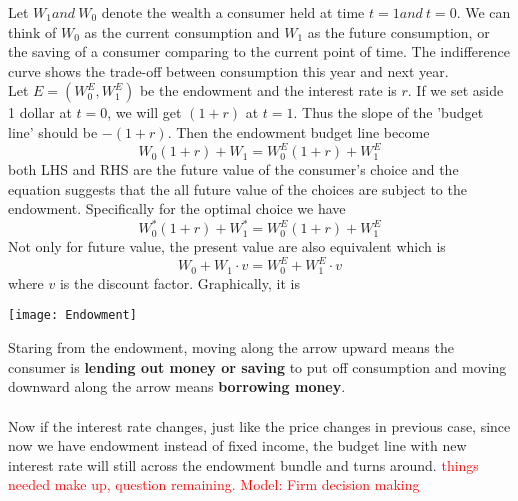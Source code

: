 \documentclass[10pt]{article}
\newenvironment{changemargin}[2]{%
  \begin{list}{}{%
    \setlength{\topsep}{0pt}%
    \setlength{\leftmargin}{#1}%
    \setlength{\rightmargin}{#2}%
    \setlength{\listparindent}{\parindent}%
    \setlength{\itemindent}{\parindent}%
    \setlength{\parsep}{\parskip}%
  }%
  \item[]}{\end{list}}
\begin{document}
\begin{changemargin}{-0.125in}{0in}
\begin{enumerate}
\begin{enumerate}
                    \smallskip
                    
                    Let $W_1 and \:W_0$ denote the wealth a consumer held at time $t=1 and \:t=0$. We can think of $W_0$ as the current consumption and $W_1$ as the future consumption, or the saving of a consumer comparing to the current point of time. The indifference curve shows the trade-off between consumption this year and next year. \\
                       
                        Let $E=(W_0^E,W_1^E)$ be the endowment and the interest rate is $r$. If we set aside 1 dollar at $t=0$, we will get $(1+r)$ at $t=1$. Thus the slope of the 'budget line' should be $-(1+r)$. Then the endowment budget line become 
                        \[
                        W_0(1+r) + W_1 = W_0^E(1+r) + W_1^E
                        \]
                       both LHS and RHS are the future value of the consumer's choice and the equation suggests that the all future value of the choices are subject to the endowment. Specifically for the optimal choice we have 
                        \[
                        W_0^*(1+r) + W_1^* = W_0^E(1+r) + W_1^E
                        \]
                        Not only for future value, the present value are also equivalent which is 
                        \[
                        W_0+W_1\cdot v = W_0^E + W_1^E \cdot v
                        \]
                        where $v$ is the discount factor. Graphically, it is 
                        
                        \begin{center}\texttt{[image: Endowment]}
                        \end{center}
                        
                        Staring from the endowment, moving along the arrow upward means the consumer is \textbf{lending out money or saving} to put off consumption and moving downward along the arrow means \textbf{borrowing money}.\\
                        \\
                        Now if the interest rate changes, just like the price changes in previous case, since now we have endowment instead of fixed income, the budget line with new interest rate will still across the endowment bundle and turns around. \textcolor{red}{things needed make up, question remaining. Model: Firm decision making}
                        

\end{enumerate}
\end{enumerate}
\end{changemargin}
\end{document}
